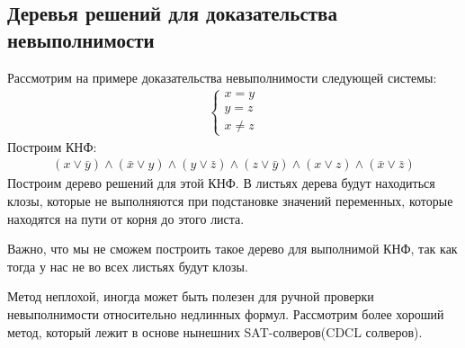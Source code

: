 \subsection{Деревья решений для доказательства невыполнимости}
Рассмотрим на примере доказательства невыполнимости следующей системы: 
\begin{gather*}
    \begin{cases}
        x = y \\
        y = z \\
        x \neq z
    \end{cases}
\end{gather*} 
Построим КНФ:
\begin{gather*}
    (x \lor \bar y) \land (\bar x \lor y) \land (y \lor \bar z) \land (z \lor \bar y) \land (x \lor z) \land (\bar x \lor \bar z)
\end{gather*}
Построим дерево решений для этой КНФ. В листьях дерева будут находиться клозы, которые не выполняются при подстановке значений переменных, которые находятся  
на пути от корня до этого листа. 
\begin{center}
\end{center}
Важно, что мы не сможем построить такое дерево для выполнимой КНФ, так как тогда у нас не во всех листьях будут клозы. 

Метод неплохой, иногда может быть полезен для ручной проверки невыполнимости относительно недлинных формул. 
Рассмотрим более хороший метод, который лежит в основе нынешних SAT-солверов(CDCL солверов). 

